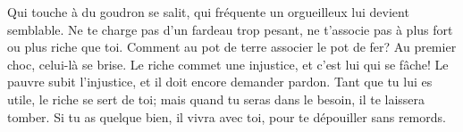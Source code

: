 Qui touche à du goudron se salit,
	qui fréquente un orgueilleux lui devient semblable.
Ne te charge pas d’un fardeau trop pesant,
	ne t’associe pas à plus fort ou plus riche que toi.
Comment au pot de terre associer le pot de fer?
	Au premier choc, celui-là se brise.
Le riche commet une injustice, et c’est lui qui se fâche!
	Le pauvre subit l’injustice, et il doit encore demander pardon.
Tant que tu lui es utile, le riche se sert de toi;
	mais quand tu seras dans le besoin, il te laissera tomber.
Si tu as quelque bien, il vivra avec toi, pour te dépouiller sans remords.
